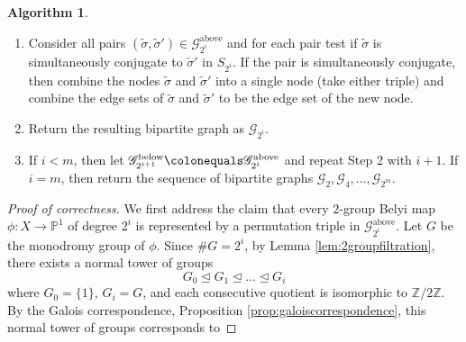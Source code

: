 \documentclass{dcthesis}
\newcommand{\PP}{\mathbb P}
\newcommand{\ZZ}{\mathbb Z}
\newcommand{\wt}[1]{\widetilde{#1}}
\DeclareMathOperator{\Lifts}{Lifts}
\theoremstyle{definition}
\newtheorem{alg}[prop]{Algorithm}
\theoremstyle{remark}
\numberwithin{equation}{section}
\numberwithin{figure}{section}
\begin{document}
{{\begin{alg}
\begin{enumerate}
\begin{enumerate}
\[                \Lifts(\sigma)
              \]
              and place an edge 
              of $\mathscr{G}_{2^i}$
              between
              $\wt{\sigma}\in\mathscr{G}_{2^i}^\text{above}$
              and
              $\sigma\in\mathscr{G}_{2^i}^\text{below}$
              if and only if $\wt{\sigma}\in\Lifts(\sigma)$.
            \item
              Consider all pairs $(\wt{\sigma},\wt{\sigma}')\in\mathscr{G}_{2^i}^\text{above}$
              and for each pair
              test if $\wt{\sigma}$ is simultaneously conjugate to
              $\wt{\sigma}'$ in $S_{2^i}$.
              If the pair is simultaneously conjugate,
              then combine the nodes $\wt{\sigma}$ and $\wt{\sigma}'$
              into a single node (take either triple)
              and combine the edge sets of $\wt{\sigma}$
              and $\wt{\sigma}'$ to be the edge set of the new node.
            \item
              Return the resulting bipartite graph as
              $\mathscr{G}_{2^i}$.
            \item
              If $i<m$, then let
              $\mathscr{G}_{2^{i+1}}^\text{below}\colonequals\mathscr{G}_{2^i}^\text{above}$
              and repeat Step 2 with $i+1$.
              If $i=m$,
              then return the sequence of bipartite graphs
              $\mathscr{G}_2,\mathscr{G}_4,\dots,\mathscr{G}_{2^m}$.
          \end{enumerate}
      \end{enumerate}
    \end{alg}
    \begin{proof}[Proof of correctness]
      We first address the claim that
      every $2$-group Belyi map $\phi:X\to\PP^1$ of degree $2^i$
      is represented by a permutation triple in
      $\mathcal{G}_{2^i}^\text{above}$.
      Let $G$ be the monodromy group of $\phi$.
      Since $\#G=2^i$,
      by Lemma \ref{lem:2groupfiltration},
      there exists a normal tower of groups
      \begin{equation}\label{eqn:2groupfiltration}
        G_0\trianglelefteq G_1\trianglelefteq\dots
        \trianglelefteq G_i
      \end{equation}
      where $G_0 = \{1\}$, $G_i = G$,
      and each consecutive quotient is isomorphic
      to $\ZZ/2\ZZ$.
      By the Galois correspondence,
      Proposition \ref{prop:galoiscorrespondence},
      this normal tower of groups corresponds to

\end{proof}}}
\end{document}
